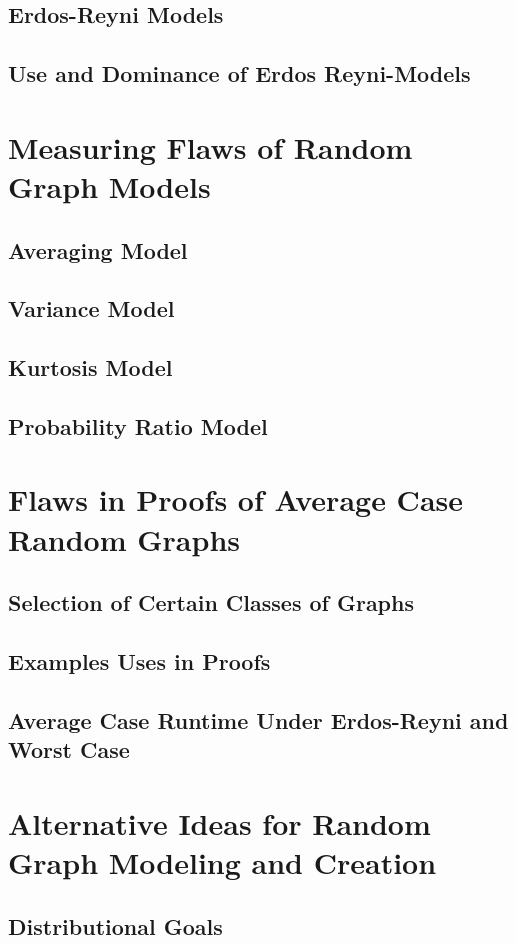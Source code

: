 \documentclass[11pt,a4paper]{report}
\begin{document}
\subsection{Erdos-Reyni Models}
\subsection{Use and Dominance of Erdos Reyni-Models}

\section{Measuring Flaws of Random Graph Models}
\subsection{Averaging Model}
\subsection{Variance Model}
\subsection{Kurtosis Model}
\subsection{Probability Ratio Model}

\section{Flaws in Proofs of Average Case Random Graphs}
\subsection{Selection of Certain Classes of Graphs}
\subsection{Examples Uses in Proofs}
\subsection{Average Case Runtime Under Erdos-Reyni and Worst Case}

\section{Alternative Ideas for Random Graph Modeling and Creation}
\subsection{Distributional Goals}
\end{document}
